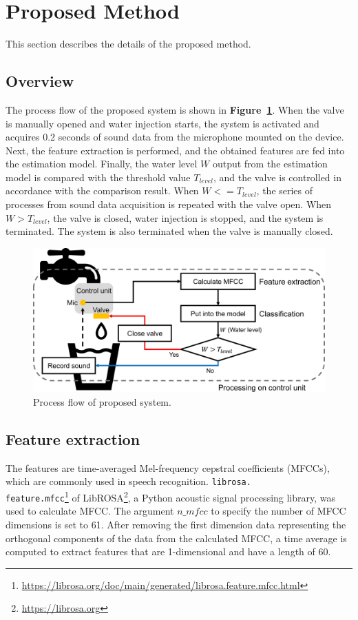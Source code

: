 \documentclass[sigconf]{acmart}
\newcommand\figref[1]{\textbf{Figure~\ref{fig:#1}}}
\begin{document}
\section{Proposed Method}
\label{sec:method}
This section describes the details of the proposed method.

\subsection{Overview}
The process flow of the proposed system is shown in \figref{method}. When the valve is manually opened and water injection starts, the system is activated and acquires 0.2 seconds of sound data from the microphone mounted on the device. Next, the feature extraction is performed, and the obtained features are fed into the estimation model. Finally, the water level $W$ output from the estimation model is compared with the threshold value $T_{level}$, and the valve is controlled in accordance with the comparison result. When $W<=T_{level}$, the series of processes from sound data acquisition is repeated with the valve open. When $W>T_{level}$, the valve is closed, water injection is stopped, and the system is terminated. The system is also terminated when the valve is manually closed.

\begin{figure}[!t]
  \centering
  \includegraphics[width=1\linewidth]{figures/method.eps}
  \caption{Process flow of proposed system.}
  \label{fig:method}
\end{figure}


\subsection{Feature extraction}
The features are time-averaged Mel-frequency cepstral coefficients (MFCCs), which are commonly used in speech recognition. \texttt{librosa.\\feature.mfcc}\footnote{\url{https://librosa.org/doc/main/generated/librosa.feature.mfcc.html}} of LibROSA\footnote{\url{https://librosa.org}}, a Python acoustic signal processing library, was used to calculate MFCC. The argument $n\_mfcc$ to specify the number of MFCC dimensions is set to 61. After removing the first dimension data representing the orthogonal components of the data from the calculated MFCC, a time average is computed to extract features that are 1-dimensional and have a length of 60.
\end{document}
